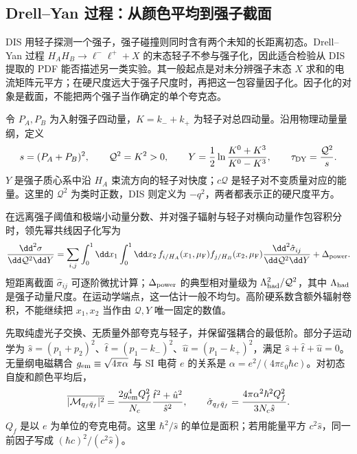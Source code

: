 \subsection{Drell--Yan 过程：从颜色平均到强子截面}
\label{sec:qcd-drell-yan-applications}

DIS 用轻子探测一个强子，强子碰撞则同时含有两个未知的长距离初态。Drell--Yan 过程 $H_AH_B\to\ell^-\ell^++X$ 的末态轻子不参与强子化，因此适合检验从 DIS 提取的 PDF 能否描述另一类实验。其一般起点是对未分辨强子末态 $X$ 求和的电流矩阵元平方；在硬尺度远大于强子尺度时，再把这一包容量因子化。因子化的对象是截面，不能把两个强子当作确定的单个夸克态。

令 $P_A,P_B$ 为入射强子四动量，$K=k_-+k_+$ 为轻子对总四动量。沿用物理动量量纲，定义
\begin{equation}
 s=(P_A+P_B)^2,\qquad \mathcal Q^2=K^2>0,\qquad
 Y=\frac12\ln\frac{K^0+K^3}{K^0-K^3},\qquad
 \tau_{\rm DY}=\frac{\mathcal Q^2}{s}.
 \label{eq:dy-observables}
\end{equation}
$Y$ 是强子质心系中沿 $H_A$ 束流方向的轻子对快度；$c\mathcal Q$ 是轻子对不变质量对应的能量。这里的 $\mathcal Q^2$ 为类时正数，DIS 则定义为 $-q^2$，两者都表示正的硬尺度平方。

在远离强子阈值和极端小动量分数、并对强子辐射与轻子对横向动量作包容积分时，领先幂共线因子化写为
\begin{equation}
 \frac{\dd^2\sigma}{\dd\mathcal Q^2\dd Y}
 =\sum_{i,j}\int_0^1\dd x_1\int_0^1\dd x_2\,
 f_{i/H_A}(x_1,\mu_{\rm F})f_{j/H_B}(x_2,\mu_{\rm F})
 \frac{\dd^2\hat\sigma_{ij}}{\dd\mathcal Q^2\dd Y}
 +\Delta_{\rm power}.
 \label{eq:dy-factorization}
\end{equation}
短距离截面 $\hat\sigma_{ij}$ 可逐阶微扰计算；$\Delta_{\rm power}$ 的典型相对量级为 $\Lambda_{\rm had}^2/\mathcal Q^2$，其中 $\Lambda_{\rm had}$ 是强子动量尺度。在运动学端点，这一估计一般不均匀。高阶硬系数含额外辐射卷积，不能继续把 $x_1,x_2$ 当作由 $\mathcal Q,Y$ 唯一固定的数值。

先取纯虚光子交换、无质量外部夸克与轻子，并保留强耦合的最低阶。部分子运动学为 $\hat s=(p_1+p_2)^2$、$\hat t=(p_1-k_-)^2$、$\hat u=(p_1-k_+)^2$，满足 $\hat s+\hat t+\hat u=0$。无量纲电磁耦合 $g_{\rm em}\equiv\sqrt{4\pi\alpha}$ 与 SI 电荷 $e$ 的关系是 $\alpha=e^2/(4\pi\varepsilon_0\hbar c)$。对初态自旋和颜色平均后，
\begin{equation}
 \overline{|\mathcal M_{q_f\bar q_f}|^2}
 =\frac{2g_{\rm em}^4Q_f^2}{N_c}
 \frac{\hat t^2+\hat u^2}{\hat s^2},\qquad
 \hat\sigma_{q_f\bar q_f}
 =\frac{4\pi\alpha^2\hbar^2Q_f^2}{3N_c\hat s}.
 \label{eq:dy-born-partonic}
\end{equation}
$Q_f$ 是以 $e$ 为单位的夸克电荷。这里 $\hbar^2/\hat s$ 的单位是面积；若用能量平方 $c^2\hat s$，同一前因子写成 $(\hbar c)^2/(c^2\hat s)$。

